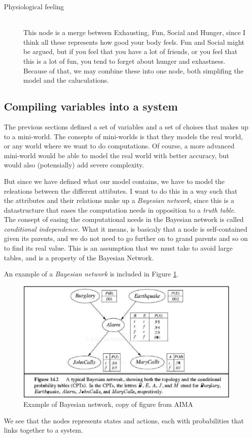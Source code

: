 \begin{description}
\item[Physiological feeling] \hfill\\
This node is a merge between Exhausting, Fun, Social and Hunger, since I think
all these represents how good your body feels. Fun and Social might be argued,
but if you feel that you have a lot of friends, or you feel that this is a lot
of fun, you tend to forget about hunger and exhastness. Because of that, we may
combine these into one node, both simplifing the model and the caluculations.

\end{description}

\subsection{Compiling variables into a system}
The previous sections defined a set of variables and a set of choises that
makes up to a mini-world. The consepts of mini-worlds is that
they models the real world, or any world where we want to do computations. Of course, a more
advanced mini-world would be able to model the real world with better accuracy,
but would also (potensially) add severe complexity.

But since we have defined what our model contains, we have to model the
releations between the different attibutes. I want to do this in a way such that
the attributes and their relations make up a \emph{Bayesian network}, since this is a datastructure that eases the
computation needs in opposition to a  \emph{truth
table}\cite{aima}. The consept of easing the computational needs in the Bayesian
network is called \emph{conditional independence}. What it means, is basicaly that a node is self-contained given
its parents, and we do not need to go further on to grand parents and so on to
find its real value. This is an assumption that we must take to avoid large
tables, and is a property of the Bayesian Network.

An example of a \emph{Bayesian network} is included in
Figure \ref{fig:BayExample}.
\begin{figure}[h]
\includegraphics[width=122mm]{figure-example1.png}
\caption{Example of Bayesian network, copy of figure from AIMA\cite{aima}}
\label{fig:BayExample}
\end{figure}
We see that the nodes represents states and actions, each with probabilities
that links together to a system.

